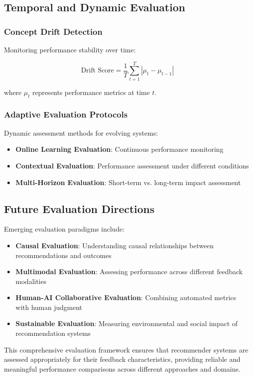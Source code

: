 \subsection{Temporal and Dynamic Evaluation}

\subsubsection{Concept Drift Detection}

Monitoring performance stability over time:

\begin{equation}
\text{Drift Score} = \frac{1}{T} \sum_{t=1}^T |\mu_{t} - \mu_{t-1}|
\label{eq:drift_score}
\end{equation}

where $\mu_t$ represents performance metrics at time $t$.

\subsubsection{Adaptive Evaluation Protocols}

Dynamic assessment methods for evolving systems:

\begin{itemize}
    \item \textbf{Online Learning Evaluation}: Continuous performance monitoring
    \item \textbf{Contextual Evaluation}: Performance assessment under different conditions
    \item \textbf{Multi-Horizon Evaluation}: Short-term vs. long-term impact assessment
\end{itemize}

\subsection{Future Evaluation Directions}

Emerging evaluation paradigms include:

\begin{itemize}
    \item \textbf{Causal Evaluation}: Understanding causal relationships between recommendations and outcomes
    \item \textbf{Multimodal Evaluation}: Assessing performance across different feedback modalities
    \item \textbf{Human-AI Collaborative Evaluation}: Combining automated metrics with human judgment
    \item \textbf{Sustainable Evaluation}: Measuring environmental and social impact of recommendation systems
\end{itemize}

This comprehensive evaluation framework ensures that recommender systems are assessed appropriately for their feedback characteristics, providing reliable and meaningful performance comparisons across different approaches and domains.
